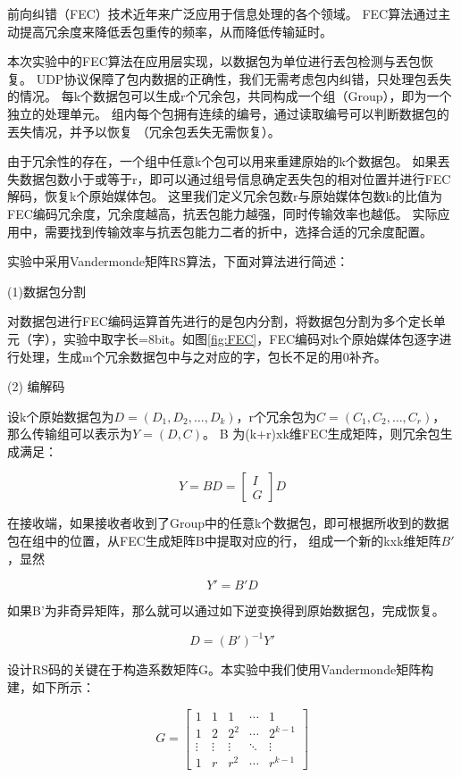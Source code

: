 \documentclass[onecolumn]{article}
\begin{document}
\begin{CJK*}{UTF8}{gbsn}
		前向纠错（FEC）技术近年来广泛应用于信息处理的各个领域。
		FEC算法通过主动提高冗余度来降低丢包重传的频率，从而降低传输延时。
		
		本次实验中的FEC算法在应用层实现，以数据包为单位进行丟包检测与丟包恢复。
		UDP协议保障了包内数据的正确性，我们无需考虑包内纠错，只处理包丢失的情况。
		每k个数据包可以生成r个冗余包，共同构成一个组（Group），即为一个独立的处理单元。
		组内每个包拥有连续的编号，通过读取编号可以判断数据包的丟失情况，并予以恢复
		（冗余包丢失无需恢复）。 
		
		由于冗余性的存在，一个组中任意k个包可以用来重建原始的k个数据包。
		如果丟失数据包数小于或等于r，即可以通过组号信息确定丟失包的相对位置并进行FEC解码，恢复k个原始媒体包。
		这里我们定义冗余包数r与原始媒体包数k的比值为FEC编码冗余度，冗余度越高，抗丟包能力越强，同时传输效率也越低。
		实际应用中，需要找到传输效率与抗丟包能力二者的折中，选择合适的冗余度配置。
		
		实验中采用Vandermonde矩阵RS算法，下面对算法进行简述：
		
		(1)数据包分割
		
		对数据包进行FEC编码运算首先进行的是包内分割，将数据包分割为多个定长单元（字），实验中取字长=8bit。如图\ref{fig:FEC}，FEC编码对k个原始媒体包逐字进行处理，生成m个冗余数据包中与之对应的字，包长不足的用0补齐。
		
		(2) 编解码
		
		设k个原始数据包为$D= (D_1,D_2,\dots,D_k)$，r个冗余包为$C=(C_1,C_2,\dots,C_r)$，那么传输组可以表示为$Y= (D,C)$。
		B 为(k+r)xk维FEC生成矩阵，则冗余包生成满足：
		
		$$Y=BD=\left[ \begin{array}{c}I\\G\end{array} \right ]D$$
		
		在接收端，如果接收者收到了Group中的任意k个数据包，即可根据所收到的数据包在组中的位置，从FEC生成矩阵B中提取对应的行， 组成一个新的kxk维矩阵$B'$，显然
		
		$$Y'=B'D$$
		
		如果B’为非奇异矩阵，那么就可以通过如下逆变换得到原始数据包，完成恢复。
		
		$$D=(B')^{-1}Y'$$
		
		设计RS码的关键在于构造系数矩阵G。本实验中我们使用Vandermonde矩阵构建，如下所示：
		
		$$G=
		\left[ \begin{array}{ccccc}
		1      & 1      & 1      & \cdots & 1       \\
		1      & 2      & 2^2    & \cdots & 2^{k-1} \\
		\vdots & \vdots & \vdots & \ddots & \vdots  \\
		1      & r      & r^2    & \cdots & r^{k-1}
		\end{array} 
		\right ]$$
		

\end{CJK*}
\end{document}
